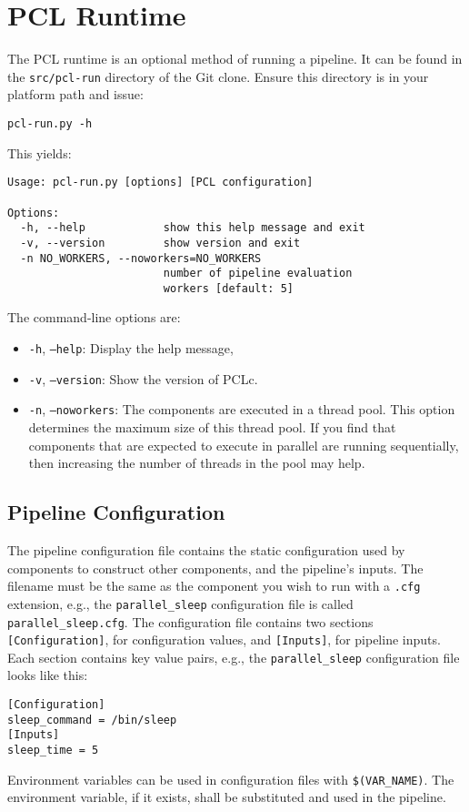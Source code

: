 \chapter{PCL Runtime}\label{chap:runtime}
The PCL runtime is an optional method of running a pipeline. It can be found in the \texttt{src/pcl-run} directory of the Git clone. Ensure this directory is in your platform path and issue:
\begin{verbatim}
pcl-run.py -h
\end{verbatim}
This yields:
\begin{verbatim}
Usage: pcl-run.py [options] [PCL configuration]

Options:
  -h, --help            show this help message and exit
  -v, --version         show version and exit
  -n NO_WORKERS, --noworkers=NO_WORKERS
                        number of pipeline evaluation
                        workers [default: 5]
\end{verbatim}

The command-line options are:
\begin{itemize}
\item \texttt{-h}, \texttt{--help}: Display the help message,
\item \texttt{-v}, \texttt{--version}: Show the version of PCLc.
\item \texttt{-n}, \texttt{--noworkers}: The components are executed in a thread pool. This option determines the maximum size of this thread pool. If you find that components that are expected to execute in parallel are running sequentially, then increasing the number of threads in the pool may help.
\end{itemize}

\section{Pipeline Configuration}
The pipeline configuration file contains the static configuration used by components to construct other components, and the pipeline's inputs. The filename must be the same as the component you wish to run with a \texttt{.cfg} extension, e.g., the \texttt{parallel\_sleep} configuration file is called \texttt{parallel\_sleep.cfg}. The configuration file contains two sections \texttt{[Configuration]}, for configuration values, and \texttt{[Inputs]}, for pipeline inputs. Each section contains key value pairs, e.g., the \texttt{parallel\_sleep} configuration file looks like this:
\begin{verbatim}
[Configuration]
sleep_command = /bin/sleep
[Inputs]
sleep_time = 5
\end{verbatim}
Environment variables can be used in configuration files with \texttt{\$(VAR\_NAME)}. The environment variable, if it exists, shall be substituted and used in the pipeline.

